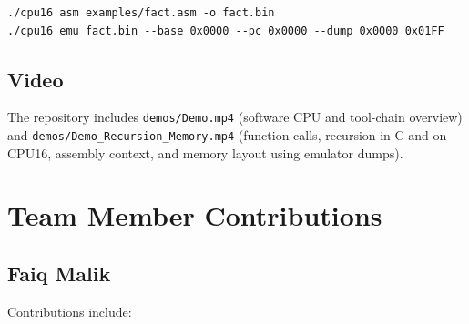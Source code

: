 \documentclass[12pt]{article}
\begin{document}
\begin{verbatim}
./cpu16 asm examples/fact.asm -o fact.bin
./cpu16 emu fact.bin --base 0x0000 --pc 0x0000 --dump 0x0000 0x01FF
\end{verbatim}

\subsection*{Video}

\noindent
The repository includes \texttt{demos/Demo.mp4} (software CPU and tool-chain overview) and \texttt{demos/Demo\_Recursion\_Memory.mp4} (function calls, recursion in C and on CPU16, assembly context, and memory layout using emulator dumps).

\clearpage

\section*{Team Member Contributions}

\subsection*{Faiq Malik}

\noindent
Contributions include:
\end{document}
